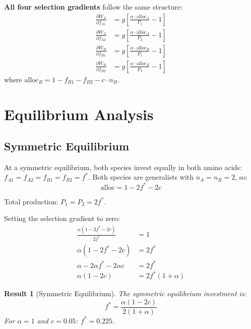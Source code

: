 \documentclass[11pt]{article}
\newtheorem{theorem}{Result}
\theoremstyle{definition}
\newcommand{\pd}[2]{\frac{\partial #1}{\partial #2}}
\begin{document}
\textbf{All four selection gradients} follow the same structure:
\begin{align}
\pd{W_A}{f_{A1}} &= g \left[\frac{\alpha \cdot \text{alloc}_A}{P_1} - 1\right] \label{eq:gradA1}\\
\pd{W_A}{f_{A2}} &= g \left[\frac{\alpha \cdot \text{alloc}_A}{P_2} - 1\right] \label{eq:gradA2}\\
\pd{W_B}{f_{B1}} &= g \left[\frac{\alpha \cdot \text{alloc}_B}{P_1} - 1\right] \label{eq:gradB1}\\
\pd{W_B}{f_{B2}} &= g \left[\frac{\alpha \cdot \text{alloc}_B}{P_2} - 1\right] \label{eq:gradB2}
\end{align}
where $\text{alloc}_B = 1 - f_{B1} - f_{B2} - c \cdot n_B$.

\section{Equilibrium Analysis}

\subsection{Symmetric Equilibrium}

At a symmetric equilibrium, both species invest equally in both amino acids: $f_{A1} = f_{A2} = f_{B1} = f_{B2} = f^*$. Both species are generalists with $n_A = n_B = 2$, so:
\begin{equation}
\text{alloc} = 1 - 2f^* - 2c
\end{equation}

Total production: $P_1 = P_2 = 2f^*$.

Setting the selection gradient to zero:
\begin{align}
\frac{\alpha(1 - 2f^* - 2c)}{2f^*} &= 1 \\
\alpha(1 - 2f^* - 2c) &= 2f^* \\
\alpha - 2\alpha f^* - 2\alpha c &= 2f^* \\
\alpha(1 - 2c) &= 2f^*(1 + \alpha)
\end{align}

\begin{theorem}[Symmetric Equilibrium]
The symmetric equilibrium investment is:
\begin{equation}
f^* = \frac{\alpha(1 - 2c)}{2(1 + \alpha)}
\label{eq:f_sym}
\end{equation}
For $\alpha = 1$ and $c = 0.05$: $f^* = 0.225$.
\end{theorem}
\end{document}
